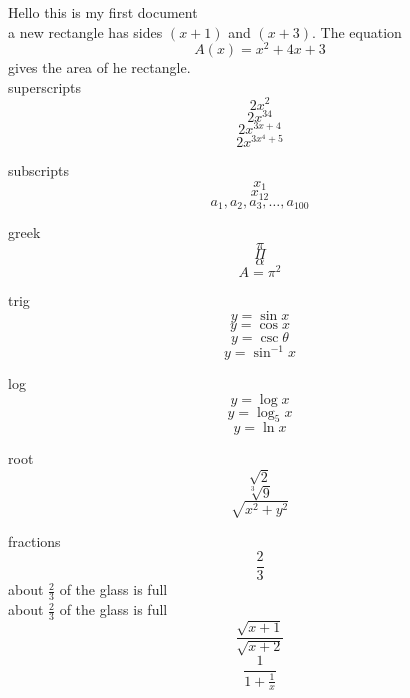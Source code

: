 \documentclass[18px]{article}
\begin{document}
Hello this is my first document\\

a new rectangle has sides $(x + 1)$ and $(x + 3)$.
The equation $${A(x) = x^2 + 4x + 3}$$ gives the area of he rectangle.\\


superscripts 
$$2x^2$$
$$2x^{34}$$
$$2x^{3x + 4}$$
$$2x^{3x^4 + 5}$$

subscripts
$$x_1$$
$$x_{12}$$
$$a_1, a_2, a_3, \ldots, a_{100}$$

greek
$$\pi$$
$$\Pi$$
$$\alpha$$
$$A = \pi ^2$$

trig
$$y = \sin x$$
$$y = \cos x$$
$$y = \csc \theta$$
$$y = \sin ^{-1} x$$

log
$$y = \log x$$
$$y = \log_5 x$$
$$y = \ln x $$

root
$$\sqrt{2}$$
$$\sqrt[3]{9}$$
$$\sqrt{x^2 + y^2}$$

fractions
$$\frac{2}{3}$$
about $\frac{2}{3}$ of the glass is full\\[6pt]
about $\displaystyle \frac{2}{3}$ of the glass is full
$$\frac{\sqrt{x + 1}}{\sqrt{x + 2}}$$
$$\frac{1}{1 + \frac{1}{x}}$$
\end{document}
